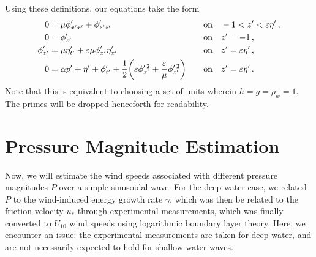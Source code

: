 \documentclass{jfm}
\renewcommand*{\epsilon}{\varepsilon}
\begin{document}
Using these definitions, our equations take the form
\begin{alignat}{2}
  0 &= \mu \phi'_{x'x'} + \phi'_{z'z'} &&\qq{on}
    -1 < z' < \epsilon \eta' \,, \label{eq:laplace_nondim} \\
  0 &= \phi'_{z'} &&\qq{on} z'=-1 \,, \label{eq:bottom_bc_nondim} \\
  \phi'_{z'} &= \mu \eta'_{t'} +
    \epsilon \mu \phi'_{x'} \eta'_{x'} &&\qq{on} z' = \epsilon \eta' \,,
    \label{eq:kinematic_bc_nondim} \\
  0 &= \alpha p' +  \eta' + \phi'_{t'} + \frac{1}{2}
    \pqty{\epsilon \phi_{x'}^{\prime \, 2} + \frac{\epsilon}{\mu}
    \phi_{z'}^{\prime \, 2}} &&\qq{on} z'= \epsilon \eta' \,.
    \label{eq:dynamic_bc_nondim}
\end{alignat}
Note that this is equivalent to choosing a set of units wherein $h = g =
\rho_w = 1$.
The primes will be dropped henceforth for readability.

\section{Pressure Magnitude Estimation}
Now, we will estimate the wind speeds associated with different pressure
magnitudes $P$ over a simple sinusoidal wave.
For the deep water case, we related $P$ to the wind-induced energy growth
rate $\gamma$, which was then be related to the friction velocity $u_*$
through experimental measurements, which was finally converted to
$U_{10}$ wind speeds using logarithmic boundary layer theory.
Here, we encounter an issue: the experimental measurements are taken for
deep water, and are not necessarily expected to hold for shallow water
waves.
\end{document}
